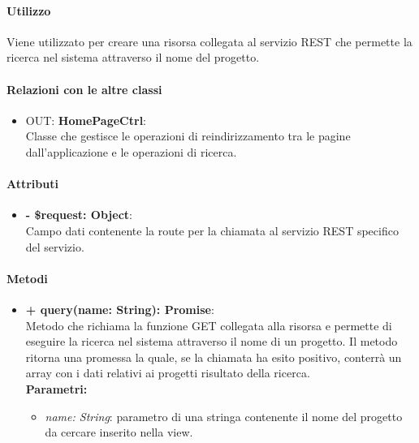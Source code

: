 		\paragraph{Utilizzo}
		Viene utilizzato per creare una risorsa collegata al servizio REST che permette la ricerca nel sistema attraverso il nome del progetto.
		
		\paragraph{Relazioni con le altre classi}
		\begin{itemize}
			\item OUT: \textbf{HomePageCtrl}:\\
			Classe che gestisce le operazioni di reindirizzamento tra le pagine dall'applicazione e le operazioni di ricerca.
		\end{itemize}
		
		\paragraph{Attributi}
		\begin{itemize}
			\item \textbf{- \$request: Object}:\\
			Campo dati contenente la route per la chiamata al servizio REST specifico del servizio.
		\end{itemize}	
		
		\paragraph{Metodi}
		\begin{itemize}
			\item \textbf{+ query(name: String): Promise}:\\
			Metodo che richiama la funzione GET collegata alla risorsa e permette di eseguire la ricerca nel sistema attraverso il nome di un progetto. Il metodo ritorna una promessa la quale, se la chiamata ha esito positivo, conterrà un array con i dati relativi ai progetti risultato della ricerca.\\
			\textbf{Parametri:}\\
			\begin{itemize}
				\item \textit{name: String}: parametro di una stringa contenente il nome del progetto da cercare inserito nella view.
			\end{itemize}
		\end{itemize}
		
